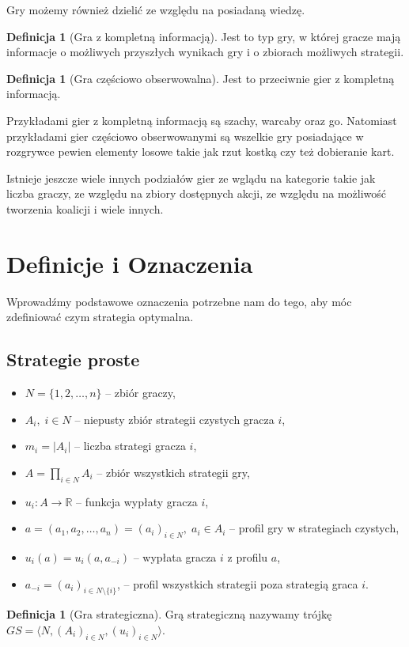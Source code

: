\documentclass[inzynierska]{pwr_wmat_praca_dyplomowa}
\theoremstyle{plain}
\numberwithin{theorem}{chapter}
\theoremstyle{definition}
\numberwithin{theorem}{chapter}
\newtheorem{definition}[theorem]{Definicja}
\begin{document}
Gry możemy również dzielić ze względu na posiadaną wiedzę.
\begin{definition}[Gra z kompletną informacją]
	Jest to typ gry, w której gracze mają informacje o możliwych
	przyszłych wynikach gry i o zbiorach możliwych strategii.
\end{definition}
\begin{definition}[Gra częściowo obserwowalna]
	Jest to przeciwnie gier z kompletną informacją.
\end{definition}
Przykładami gier z kompletną informacją są szachy, warcaby oraz go.
Natomiast przykładami gier częściowo obserwowanymi są wszelkie gry posiadające w rozgrywce pewien elementy losowe takie jak rzut kostką czy też dobieranie kart. 

Istnieje jeszcze wiele innych podziałów gier ze wglądu na kategorie takie jak liczba graczy, ze względu na zbiory dostępnych akcji, ze względu na możliwość tworzenia koalicji i wiele innych.

\section{Definicje i Oznaczenia}
Wprowadźmy podstawowe oznaczenia potrzebne nam do tego, aby móc zdefiniować czym strategia optymalna.
\subsection{Strategie proste}
\begin{itemize}
	\item $ N = \{1,2,\dots, n\} $ -- zbiór graczy,
	\item $A_i,\; i \in N $ -- niepusty zbiór strategii  czystych gracza $i$,
	\item $m_i = |A_i|$ -- liczba strategi gracza $i$,
	\item $A = \displaystyle\prod_{i \in N} A_i$ -- zbiór wszystkich strategii gry, 
	\item $u_i : A \rightarrow \mathbb{R} $ -- funkcja wypłaty gracza $i$,
	\item $a=(a_1,a_2,\dots,a_n)=(a_i)_{i \in N},\; a_i \in A_i$ -- profil gry w strategiach czystych,
	\item $u_i(a) = u_i(a,a_{-i})$ -- wypłata gracza $i$ z profilu $a$,
	\item $a_{-i} = (a_i)_{i\in N \setminus \{i\}}$, -- profil wszystkich strategii poza strategią graca $i$.
\end{itemize}
	\begin{definition}[Gra strategiczna]
		Grą strategiczną nazywamy trójkę $GS = \langle N, (A_i)_{i \in N},(u_i)_{i \in N} \rangle $.
	\end{definition}
	
\end{document}
